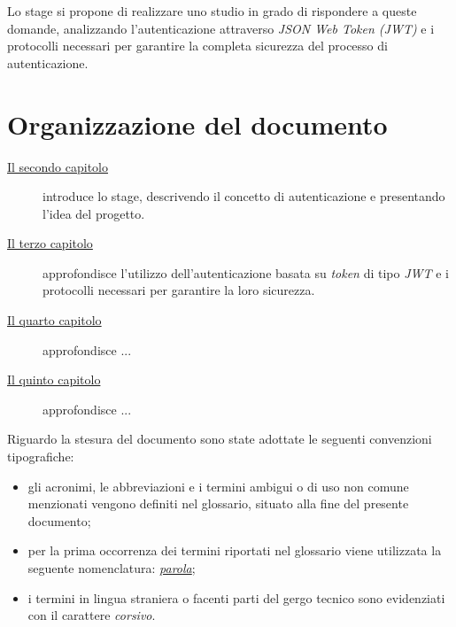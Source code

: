 Lo stage si propone di realizzare uno studio in grado di rispondere a queste domande, analizzando l'autenticazione attraverso \emph{JSON Web Token (JWT)} e i protocolli necessari per garantire la completa sicurezza del processo di autenticazione.


\section{Organizzazione del documento}
\label{sec:organizzazione-documento}

\begin{description}
    \item[{\hyperref[cap:inquadramento-stage]{Il secondo capitolo}}] introduce lo stage, descrivendo il concetto di autenticazione e presentando l'idea del progetto.
    
    \item[{\hyperref[cap:autenticazione-jwt]{Il terzo capitolo}}] approfondisce l'utilizzo dell'autenticazione basata su \emph{\gls{token}} di tipo \emph{JWT} e i protocolli necessari per garantire la loro sicurezza.
    
    \item[{\hyperref[cap:analisi-requisiti]{Il quarto capitolo}}] approfondisce ...
    
    \item[{\hyperref[cap:progettazione-codifica]{Il quinto capitolo}}] approfondisce ...
\end{description}

Riguardo la stesura del documento sono state adottate le seguenti convenzioni tipografiche:
\begin{itemize}
	\item gli acronimi, le abbreviazioni e i termini ambigui o di uso non comune menzionati vengono definiti nel glossario, situato alla fine del presente documento;
	\item per la prima occorrenza dei termini riportati nel glossario viene utilizzata la seguente nomenclatura: \emph{\hyperref[sec:organizzazione-documento]{parola}};
	\item i termini in lingua straniera o facenti parti del gergo tecnico sono evidenziati con il carattere \emph{corsivo}.
\end{itemize}
